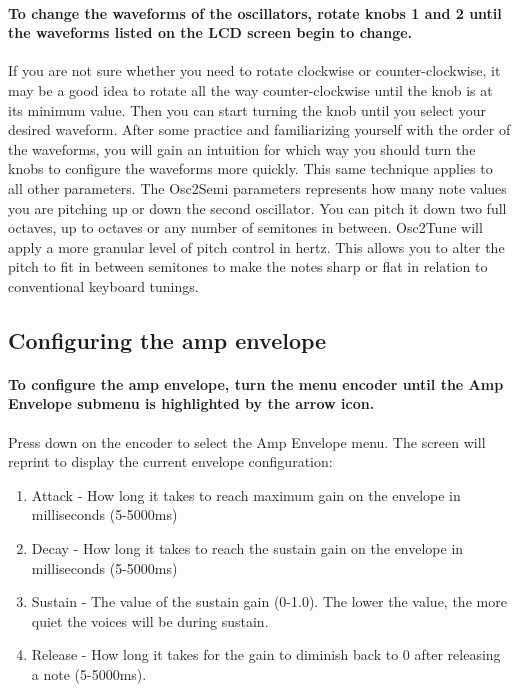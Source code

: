 \documentclass[acmlarge,screen]{acmart}
\begin{document}
\paragraph{To change the waveforms of the oscillators, rotate knobs 1 and 2 until the waveforms listed on the LCD screen begin to change.} If you are not sure whether you need to rotate clockwise or counter-clockwise, it may be a good idea to rotate all the way counter-clockwise until the knob is at its minimum value. Then you can start turning the knob until you select your desired waveform. After some practice and familiarizing yourself with the order of the waveforms, you will gain an intuition for which way you should turn the knobs to configure the waveforms more quickly. This same technique applies to all other parameters. The Osc2Semi parameters represents how many note values you are pitching up or down the second oscillator. You can pitch it down two full octaves, up to octaves or any number of semitones in between. Osc2Tune will apply a more granular level of pitch control in hertz. This allows you to alter the pitch to fit in between semitones to make the notes sharp or flat in relation to conventional keyboard tunings.

\subsection{Configuring the amp envelope}
\paragraph{To configure the amp envelope, turn the menu encoder until the Amp Envelope submenu is highlighted by the arrow icon.} Press down on the encoder to select the Amp Envelope menu. The screen will reprint to display the current envelope configuration:\\
	\begin{enumerate}
		\item Attack - How long it takes to reach maximum gain on the envelope in milliseconds (5-5000ms)
		\item Decay - How long it takes to reach the sustain gain on the envelope in milliseconds (5-5000ms)
		\item Sustain - The value of the sustain gain (0-1.0). The lower the value, the more quiet the voices will be during sustain.
		\item Release - How long it takes for the gain to diminish back to 0 after releasing a note (5-5000ms).
	\end{enumerate}
\end{document}

